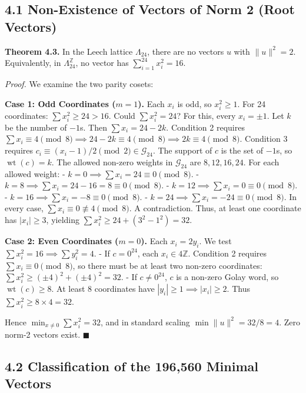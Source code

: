 \documentclass[11pt,twoside,openright]{amsbook}
\begin{document}
\subsection{4.1 Non-Existence of Vectors of Norm 2 (Root Vectors)}

\textbf{Theorem 4.3.} In the Leech lattice $\Lambda_{24}$, there are no vectors $u$ with $\|u\|^2 = 2$. Equivalently, in $\Lambda_{24}^{\mathbb{Z}}$, no vector has $\sum_{i=1}^{24} x_i^2 = 16$.

\textit{Proof.} We examine the two parity cosets:

\textbf{Case 1: Odd Coordinates ($m = 1$).}
Each $x_i$ is odd, so $x_i^2 \ge 1$. For 24 coordinates: $\sum x_i^2 \ge 24 > 16$.
Could $\sum x_i^2 = 24$? For this, every $x_i = \pm 1$.
Let $k$ be the number of $-1$s. Then $\sum x_i = 24 - 2k$.
Condition 2 requires $\sum x_i \equiv 4 \pmod 8 \implies 24 - 2k \equiv 4 \pmod 8 \implies 2k \equiv 4 \pmod 8$.
Condition 3 requires $c_i \equiv (x_i - 1)/2 \pmod 2 \in \mathcal{G}_{24}$. The support of $c$ is the set of $-1$s, so $\operatorname{wt}(c) = k$.
The allowed non-zero weights in $\mathcal{G}_{24}$ are $8, 12, 16, 24$.
For each allowed weight:
- $k = 0 \implies \sum x_i = 24 \equiv 0 \pmod 8$.
- $k = 8 \implies \sum x_i = 24 - 16 = 8 \equiv 0 \pmod 8$.
- $k = 12 \implies \sum x_i = 0 \equiv 0 \pmod 8$.
- $k = 16 \implies \sum x_i = -8 \equiv 0 \pmod 8$.
- $k = 24 \implies \sum x_i = -24 \equiv 0 \pmod 8$.
In every case, $\sum x_i \equiv 0 \not\equiv 4 \pmod 8$. A contradiction.
Thus, at least one coordinate has $|x_i| \ge 3$, yielding $\sum x_i^2 \ge 24 + (3^2 - 1^2) = 32$.

\textbf{Case 2: Even Coordinates ($m = 0$).}
Each $x_i = 2y_i$. We test $\sum x_i^2 = 16 \implies \sum y_i^2 = 4$.
- If $c = 0^{24}$, each $x_i \in 4\mathbb{Z}$. Condition 2 requires $\sum x_i \equiv 0 \pmod 8$, so there must be at least two non-zero coordinates: $\sum x_i^2 \ge (\pm 4)^2 + (\pm 4)^2 = 32$.
- If $c \ne 0^{24}$, $c$ is a non-zero Golay word, so $\operatorname{wt}(c) \ge 8$. At least 8 coordinates have $|y_i| \ge 1 \implies |x_i| \ge 2$. Thus $\sum x_i^2 \ge 8 \times 4 = 32$.

Hence $\min_{x \ne 0} \sum x_i^2 = 32$, and in standard scaling $\min \|u\|^2 = 32/8 = 4$. Zero norm-2 vectors exist. $\blacksquare$

\subsection{4.2 Classification of the 196,560 Minimal Vectors}
\end{document}
